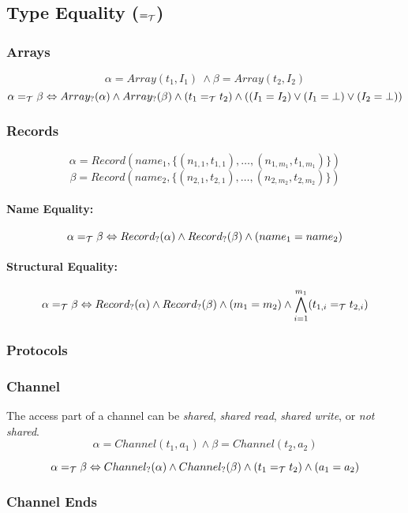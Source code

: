 \documentclass[]{article}
\begin{document}
\subsection{Type Equality ($=_{\cal T}$)}

\subsubsection{Arrays}
\[
\alpha = Array(t_1, I_1)\ \wedge \beta =  Array(t_2, I_2)
\]
\[
\alpha =_{\cal T} \beta \Leftrightarrow Array_?(\alpha) \wedge Array_?(\beta) \wedge (t_1 =_{\cal T} t_2) \wedge ((I_1 = I_2) \vee (I_1 = \bot) \vee (I_2 = \bot))
\]

\subsubsection{Records}

\[
\alpha = Record(name_1, \{(n_{1,1},t_{1,1}),\ldots,(n_{1,m_1}, t_{1,m_1})\})
\]
\[
\beta = Record(name_2, \{(n_{2,1},t_{2,1}),\ldots,(n_{2,m_2}, t_{2,m_2})\})
\]
\paragraph{Name Equality:}
\[
\alpha =_{\cal T} \beta \Leftrightarrow Record_?(\alpha) \wedge Record_?(\beta) \wedge (name_1 = name_2)
\]
\paragraph{Structural Equality:}
\[
\alpha =_{\cal T} \beta \Leftrightarrow Record_?(\alpha) \wedge Record_?(\beta) \wedge (m_1 = m_2) \wedge \bigwedge^{m_1}_{i=1} (t_{1,i} =_{\cal T} t_{2,i})
\]
	
\subsubsection{Protocols}

\subsubsection{Channel}

The access part of a channel can be {\it shared}, {\it shared read}, {\it shared write}, or {\it not shared}. 
\
\[
\alpha = Channel(t_1, a_1) \wedge \beta = Channel(t_2, a_2)\]

\[
\alpha =_{\cal T} \beta \Leftrightarrow Channel_?(\alpha) \wedge Channel_?(\beta) \wedge (t_1 =_{\cal T} t_2) \wedge (a_1 = a_2)
\]

\subsubsection{Channel Ends}
\end{document}
